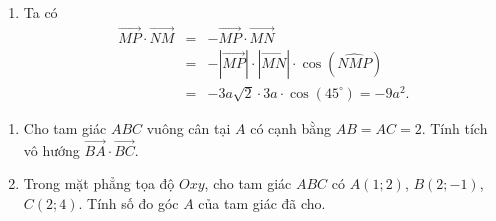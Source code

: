 \begin{bt}
{\begin{enumerate}
		\item Ta có 
		\allowdisplaybreaks
		\begin{eqnarray*}
		\overrightarrow{MP} \cdot \overrightarrow{NM}&=&-\overrightarrow{MP} \cdot \overrightarrow{MN}\\
		&=&-\left|\overrightarrow{MP}\right| \cdot \left|\overrightarrow{MN}\right|\cdot \cos (\widehat{NMP})\\
		&=&-3a\sqrt{2}\cdot 3a\cdot \cos (45^\circ)=-9a^2.	
		\end{eqnarray*}
	\end{enumerate}
	}
\end{bt}

\begin{bt}%
	\hfill 
	\begin{enumerate}
		\item Cho tam giác $ABC$ vuông cân tại $A$ có cạnh bằng $AB=AC=2$. Tính tích vô hướng $\overrightarrow{BA}\cdot \overrightarrow{BC}$.
		\item Trong mặt phẳng tọa độ $Oxy$, cho tam giác $ABC$ có $A(1;2)$, $B(2;-1)$, $C(2;4)$. Tính số đo góc $A$ của tam giác đã cho.
	\end{enumerate}
\end{bt}

